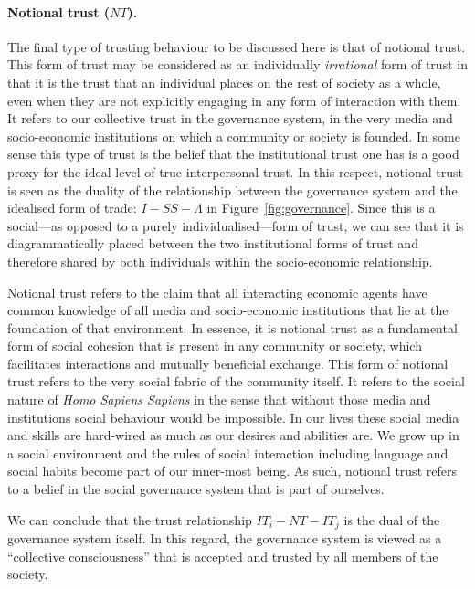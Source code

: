 \begin{subappendices}
\paragraph{Notional trust ($NT$).}

The final type of trusting behaviour to be discussed here is that of notional trust. This form of trust may be considered as an individually \textit{irrational} form of trust in that it is the trust that an individual places on the rest of society as a whole, even when they are not explicitly engaging in any form of interaction with them. It refers to our collective trust in the governance system, in the very media and socio-economic institutions on which a community or society is founded. In some sense this type of trust is the belief that the institutional trust one has is a good proxy for the ideal level of true interpersonal trust. In this respect, notional trust is seen as the duality of the relationship between the governance system and the idealised form of trade: $I-SS-\Lambda$ in Figure~\ref{fig:governance}. Since this is a social---as opposed to a purely individualised---form of trust, we can see that it is diagrammatically placed between the two institutional forms of trust and therefore shared by both individuals within the socio-economic relationship.

Notional trust refers to the claim that all interacting economic agents have common knowledge of all media and socio-economic institutions that lie at the foundation of that environment. In essence, it is notional trust as a fundamental form of social cohesion that is present in any community or society, which facilitates interactions and mutually beneficial exchange. This form of notional trust refers to the very social fabric of the community itself. It refers to the social nature of \textit{Homo Sapiens Sapiens} in the sense that without those media and institutions social behaviour would be impossible. In our lives these social media and skills are hard-wired as much as our desires and abilities are. We grow up in a social environment and the rules of social interaction including language and social habits become part of our inner-most being. As such, notional trust refers to a belief in the social governance system that is part of ourselves.

We can conclude that the trust relationship $IT_{i}-NT-IT_{j}$ is the dual of the governance system itself. In this regard, the governance system is viewed as a ``collective consciousness'' that is accepted and trusted by all members of the society.


\end{subappendices}
